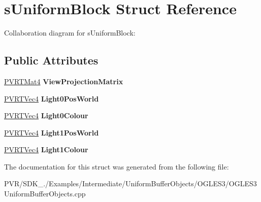 \hypertarget{structs_uniform_block}{\section{s\+Uniform\+Block Struct Reference}
\label{structs_uniform_block}
}


Collaboration diagram for s\+Uniform\+Block\+:
\subsection*{Public Attributes}
\begin{DoxyCompactItemize}
\item 
\hypertarget{structs_uniform_block_adaf0576fe90e36a5d2ead406bb0c6c44}{\hyperlink{struct_p_v_r_t_mat4}{P\+V\+R\+T\+Mat4} {\bfseries View\+Projection\+Matrix}}\label{structs_uniform_block_adaf0576fe90e36a5d2ead406bb0c6c44}

\item 
\hypertarget{structs_uniform_block_a33deaba0253d64c860786ec1fc4e93f5}{\hyperlink{struct_p_v_r_t_vec4}{P\+V\+R\+T\+Vec4} {\bfseries Light0\+Pos\+World}}\label{structs_uniform_block_a33deaba0253d64c860786ec1fc4e93f5}

\item 
\hypertarget{structs_uniform_block_acc4edcfc247aab6b2a0b843694539d77}{\hyperlink{struct_p_v_r_t_vec4}{P\+V\+R\+T\+Vec4} {\bfseries Light0\+Colour}}\label{structs_uniform_block_acc4edcfc247aab6b2a0b843694539d77}

\item 
\hypertarget{structs_uniform_block_a77d4c7e94da765e85574a07c2fb17d18}{\hyperlink{struct_p_v_r_t_vec4}{P\+V\+R\+T\+Vec4} {\bfseries Light1\+Pos\+World}}\label{structs_uniform_block_a77d4c7e94da765e85574a07c2fb17d18}

\item 
\hypertarget{structs_uniform_block_a20d0b677c9a728719d529885678d3b4b}{\hyperlink{struct_p_v_r_t_vec4}{P\+V\+R\+T\+Vec4} {\bfseries Light1\+Colour}}\label{structs_uniform_block_a20d0b677c9a728719d529885678d3b4b}

\end{DoxyCompactItemize}


The documentation for this struct was generated from the following file\+:\begin{DoxyCompactItemize}
\item 
P\+V\+R/\+S\+D\+K\+\_./\+Examples/\+Intermediate/\+Uniform\+Buffer\+Objects/\+O\+G\+L\+E\+S3/O\+G\+L\+E\+S3\+Uniform\+Buffer\+Objects.\+cpp\end{DoxyCompactItemize}
